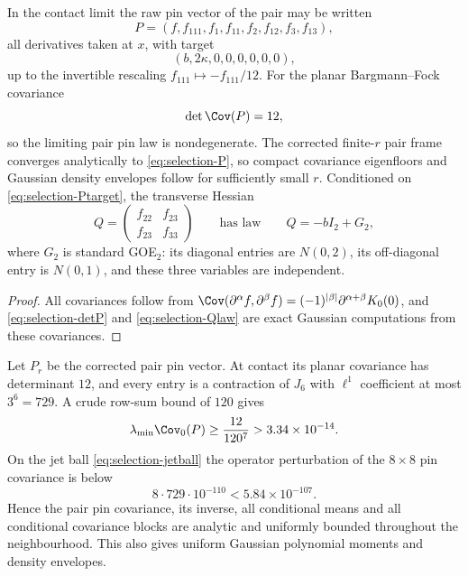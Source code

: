 \begin{lemma}\label{lem:selection-pairlaw}
In the contact limit the raw pin vector of the pair may be written
\begin{equation}\label{eq:selection-P}
P=(f,f_{111},f_1,f_{11},f_2,f_{12},f_3,f_{13}),
\end{equation}
all derivatives taken at $x$, with target
\begin{equation}\label{eq:selection-Ptarget}
(b,2\kappa,0,0,0,0,0,0),
\end{equation}
up to the invertible rescaling $f_{111}\mapsto-f_{111}/12$. For the planar Bargmann--Fock covariance
\begin{equation}\label{eq:selection-detP}
\det\Cov(P)=12,
\end{equation}
so the limiting pair pin law is nondegenerate. The corrected finite-$r$ pair frame converges analytically to \eqref{eq:selection-P}, so compact covariance eigenfloors and Gaussian density envelopes follow for sufficiently small $r$. Conditioned on \eqref{eq:selection-Ptarget}, the transverse Hessian
\begin{equation}\label{eq:selection-Qlaw}
Q=\begin{pmatrix}f_{22}&f_{23}\\f_{23}&f_{33}\end{pmatrix}\qquad\text{has law}\qquad Q=-bI_2+G_2,
\end{equation}
where $G_2$ is standard GOE$_2$: its diagonal entries are $N(0,2)$, its off-diagonal entry is $N(0,1)$, and these three variables are independent.
\end{lemma}

\begin{proof}
All covariances follow from $\Cov(\partial^\alpha f,\partial^\beta f)=(-1)^{|\beta|}\partial^{\alpha+\beta}K_0(0)$, and \eqref{eq:selection-detP} and \eqref{eq:selection-Qlaw} are exact Gaussian computations from these covariances.
\end{proof}

\begin{lemma}\label{lem:selection-pinstab}
Let $P_r$ be the corrected pair pin vector. At contact its planar covariance has determinant $12$, and every entry is a contraction of $J_6$ with $\ell^1$ coefficient at most $3^6=729$. A crude row-sum bound of $120$ gives
\begin{equation}\label{eq:selection-pinfloor}
\lambda_{\min}\Cov_0(P)\ge\frac{12}{120^7}>3.34\times10^{-14}.
\end{equation}
On the jet ball \eqref{eq:selection-jetball} the operator perturbation of the $8\times8$ pin covariance is below
\begin{equation}\label{eq:selection-pinpert}
8\cdot729\cdot10^{-110}<5.84\times10^{-107}.
\end{equation}
Hence the pair pin covariance, its inverse, all conditional means and all conditional covariance blocks are analytic and uniformly bounded throughout the neighbourhood. This also gives uniform Gaussian polynomial moments and density envelopes.
\end{lemma}

